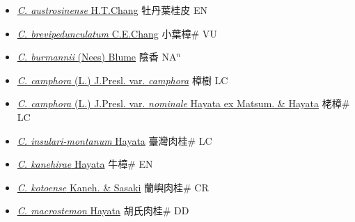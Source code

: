 \begin{itemize}
  \begin{itemize}
        \item[] \href{http://www.theplantlist.org/tpl1.1/search?q=Cinnamomum+austrosinense}{\textit{C. austrosinense} H.T.Chang}   牡丹葉桂皮 EN
        \item[] \href{http://www.theplantlist.org/tpl1.1/search?q=Cinnamomum+brevipedunculatum}{\textit{C. brevipedunculatum} C.E.Chang}   小葉樟\# VU
        \item[] \href{http://www.theplantlist.org/tpl1.1/search?q=Cinnamomum+burmannii}{\textit{C. burmannii} (Nees) Blume}   陰香 NA$^n$
        \item[] \href{http://www.theplantlist.org/tpl1.1/search?q=Cinnamomum+camphora+var.+camphora}{\textit{C. camphora} (L.) J.Presl. var. \textit{camphora}}   樟樹 LC
        \item[] \href{http://www.theplantlist.org/tpl1.1/search?q=Cinnamomum+camphora+var.+nominale}{\textit{C. camphora} (L.) J.Presl. var. \textit{nominale} Hayata ex Matsum. \& Hayata}   栳樟\# LC
        \item[] \href{http://www.theplantlist.org/tpl1.1/search?q=Cinnamomum+insulari-montanum}{\textit{C. insulari-montanum} Hayata}   臺灣肉桂\# LC
        \item[] \href{http://www.theplantlist.org/tpl1.1/search?q=Cinnamomum+kanehirae}{\textit{C. kanehirae} Hayata}   牛樟\# EN
        \item[] \href{http://www.theplantlist.org/tpl1.1/search?q=Cinnamomum+kotoense}{\textit{C. kotoense} Kaneh. \& Sasaki}   蘭嶼肉桂\# CR
        \item[] \href{http://www.theplantlist.org/tpl1.1/search?q=Cinnamomum+macrostemon}{\textit{C. macrostemon} Hayata}   胡氏肉桂\# DD

\end{itemize}
\end{itemize}
